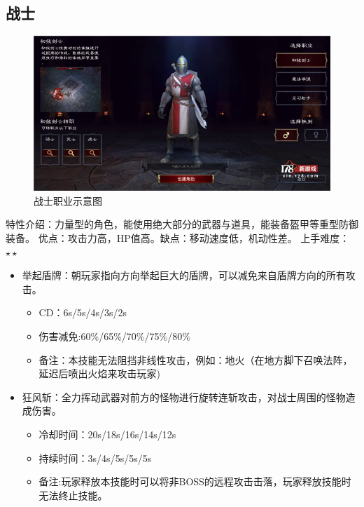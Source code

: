 \documentclass[UTF8,AutoFakeBold=1,AutoFakeSlant,zihao=-4]{cucthesis}
\begin{document}
\subsection{战士}

\begin{figure}[ht]
    \centering
    \includegraphics[scale=0.5]{imgs/战士.jpg}    
    \caption{战士职业示意图}
\end{figure}

特性介绍：力量型的角色，能使用绝大部分的武器与道具，能装备盔甲等重型防御装备。
优点：攻击力高，HP值高。缺点：移动速度低，机动性差。
上手难度：$\star\star$

\begin{itemize}
    \item 举起盾牌：朝玩家指向方向举起巨大的盾牌，可以减免来自盾牌方向的所有攻击。
    \begin{itemize}
        \item CD：6s/5s/4s/3s/2s
        \item 伤害减免:60\%/65\%/70\%/75\%/80\%
        \item 备注：本技能无法阻挡非线性攻击，例如：地火（在地方脚下召唤法阵，延迟后喷出火焰来攻击玩家)
    \end{itemize}

    \item 狂风斩：全力挥动武器对前方的怪物进行旋转连斩攻击，对战士周围的怪物造成伤害。
    \begin{itemize}
        \item 冷却时间：20s/18s/16s/14s/12s
        \item 持续时间：3s/4s/5s/5s/5s
        \item 备注:玩家释放本技能时可以将非BOSS的远程攻击击落，玩家释放技能时无法终止技能。
    \end{itemize}
\end{itemize}
\end{document}
